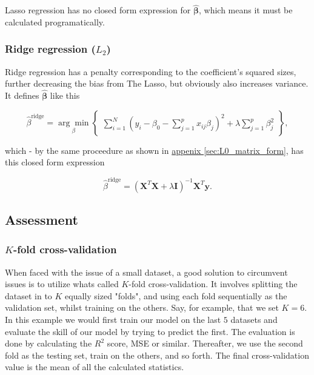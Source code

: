 Lasso regression has no closed form expression for $\hat{\mathbf \beta}$, which means it must be calculated programatically.


\subsubsection{Ridge regression ($L_2$)}
Ridge regression has a penalty corresponding to the coefficient's squared sizes, further decreasing the bias from The Lasso, but obviously also increases variance. It defines $\hat{\mathbf \beta}$ like this

\begin{equation*}
  \hat \beta^{\text{ridge}} = \underset{\beta}{\arg \min} \begin{Bmatrix}\sum_{i=1}^N\left(y_i - \beta_0 - \sum_{j=1}^p x_{ij}\beta_j\right)^2 + \lambda \sum_{j=1}^p \beta_j^2 \end{Bmatrix},
\end{equation*}

which - by the same proceedure as shown in \hyperref[sec:L0_matrix_form]{appenix \ref*{sec:L0_matrix_form}}, has this closed form expression

\begin{equation}
  \hat \beta^{\text{ridge}} = (\mathbf X^T\mathbf X + \lambda \mathbf I)^{-1}\mathbf X^T\mathbf y.
\end{equation}

\subsection{Assessment}
\subsubsection{$K$-fold cross-validation}
When faced with the issue of a small dataset, a good solution to circumvent issues is to utilize whats called $K$-fold cross-validation. It involves splitting the dataset in to $K$ equally sized "folds", and using each fold sequentially as the validation set, whilst training on the others. Say, for example, that we set $K=6$. In this example we would first train our model on the last $5$ datasets and evaluate the skill of our model by trying to predict the first. The evaluation is done by calculating the $R^2$ score, MSE or similar. Thereafter, we use the second fold as the testing set, train on the others, and so forth. The final cross-validation value is the mean of all the calculated statistics.


